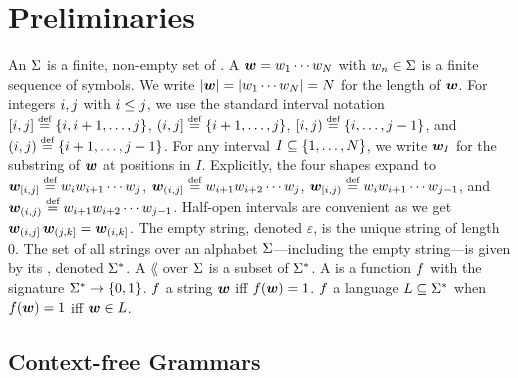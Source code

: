 \documentclass{article}
\begin{document}
\section{Preliminaries}
An  ${{ \Sigma}}$ is a finite, non-empty set of . 
A  ${{\boldsymbol{w}}} = {w}_1 \cdots {w}_N$ with ${w}_n \in {{ \Sigma}}$ is a finite sequence of symbols.
We write $|{{\boldsymbol{w}}}| = |{w}_1 \cdots {w}_N| = N$ for the length of ${{\boldsymbol{w}}}$.
For integers ${{ i}}, {{ j}}$ with ${{ i}} \leq {{ j}}$, we use the standard interval notation $[\idxi, \idxj] \defeq \set{\idxi, \idxi+1, \ldots, \idxj}$, $(\idxi, \idxj] \defeq \set{\idxi+1, \ldots, \idxj}$, $[\idxi, \idxj) \defeq \set{\idxi, \ldots, \idxj-1}$, and $(\idxi, \idxj) \defeq \set{\idxi+1, \ldots, \idxj-1}$.
For any interval $I \subseteq {{\{ 1, \ldots, N \}}}$, we write ${{\boldsymbol{w}}}_I$ for the substring of ${{\boldsymbol{w}}}$ at positions in $I$. Explicitly, the four shapes expand to
$\str_{[\idxi, \idxj]} \defeq \strSym_\idxi \strSym_{\idxi+1} \cdots \strSym_\idxj$,
$\str_{(\idxi, \idxj]} \defeq \strSym_{\idxi+1} \strSym_{\idxi+2} \cdots \strSym_\idxj$,
$\str_{[\idxi, \idxj)} \defeq \strSym_\idxi \strSym_{\idxi+1} \cdots \strSym_{\idxj-1}$, and
$\str_{(\idxi, \idxj)} \defeq \strSym_{\idxi+1} \strSym_{\idxi+2} \cdots \strSym_{\idxj-1}$.
Half-open intervals are convenient as we get ${{\boldsymbol{w}}}_{({{ i}}, {{ j}}]}\,{{\boldsymbol{w}}}_{({{ j}}, {{ k}}]} = {{\boldsymbol{w}}}_{({{ i}}, {{ k}}]}$.
The empty string, denoted $\varepsilon$, is the unique string of length 0.
The set of all strings over an alphabet ${{ \Sigma}}$---including the empty string---is given by its , denoted ${{{{ \Sigma}}^*}}$.
A  $\lang$ over ${{ \Sigma}}$ is a subset of ${{{{ \Sigma}}^*}}$.
A  is a function ${{ f}}$ with the signature ${{{{ \Sigma}}^*}} \to {{\{ 0,1 \}}}$. 
${{ f}}$  a string ${{\boldsymbol{w}}}$ iff ${{ f}}({{\boldsymbol{w}}}) = 1$.
${{ f}}$  a language ${L} \subseteq {{{{ \Sigma}}^*}}$ when ${{ f}}({{\boldsymbol{w}}}) = 1$ iff ${{\boldsymbol{w}}} \in {L}$.

\subsection{Context-free Grammars}
\end{document}
